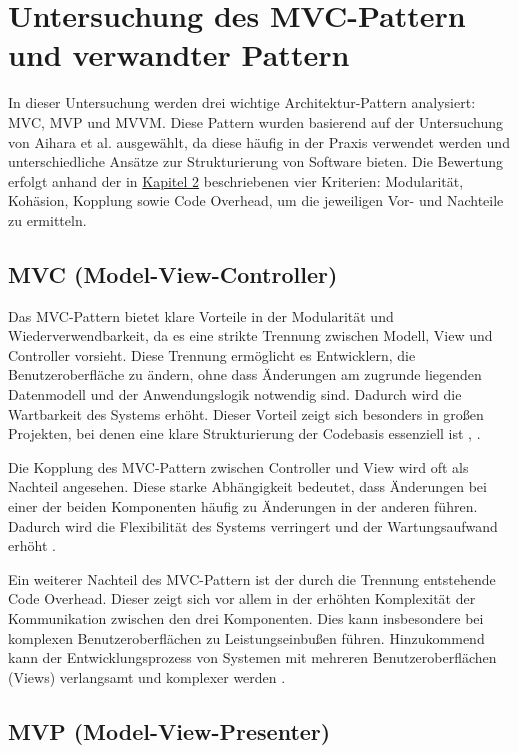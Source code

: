 \chapter{Untersuchung des MVC-Pattern und verwandter Pattern}

In dieser Untersuchung werden drei wichtige Architektur-Pattern analysiert: \ac{MVC}, \ac{MVP} und \ac{MVVM}. Diese Pattern wurden basierend auf der Untersuchung von Aihara et al. \cite{aihara2012mvc} ausgewählt, da diese häufig in der Praxis verwendet werden und unterschiedliche Ansätze zur Strukturierung von Software bieten. Die Bewertung erfolgt anhand der in \hyperref[chap:methodik]{Kapitel 2} beschriebenen vier Kriterien: Modularität, Kohäsion, Kopplung sowie Code Overhead, um die jeweiligen Vor- und Nachteile zu ermitteln.

\section{MVC (Model-View-Controller)}

Das \ac{MVC}-Pattern bietet klare Vorteile in der Modularität und Wiederverwendbarkeit, da es eine strikte Trennung zwischen 
Modell, View und Controller vorsieht. Diese Trennung ermöglicht 
es Entwicklern, die Benutzeroberfläche zu ändern, ohne dass 
Änderungen am zugrunde liegenden Datenmodell und der Anwendungslogik notwendig sind. Dadurch wird die Wartbarkeit des Systems erhöht. Dieser Vorteil zeigt sich besonders in großen Projekten, bei denen eine klare Strukturierung der Codebasis essenziell ist \cite{eudl63}, 
\cite{researchgate65}.

Die Kopplung des \ac{MVC}-Pattern zwischen Controller und View wird oft als Nachteil angesehen. Diese starke Abhängigkeit bedeutet, dass Änderungen bei einer der beiden Komponenten häufig zu Änderungen in der anderen führen. Dadurch wird die Flexibilität des Systems verringert und der Wartungsaufwand erhöht \cite{researchgate65}.

Ein weiterer Nachteil des \ac{MVC}-Pattern ist der durch die Trennung entstehende Code Overhead. Dieser zeigt sich vor allem in der erhöhten Komplexität der Kommunikation zwischen den drei 
Komponenten. Dies kann insbesondere bei komplexen Benutzeroberflächen zu Leistungseinbußen führen. Hinzukommend kann der Entwicklungsprozess von Systemen mit mehreren Benutzeroberflächen (Views) verlangsamt und komplexer werden \cite{eudl63}.

\section{MVP (Model-View-Presenter)}

